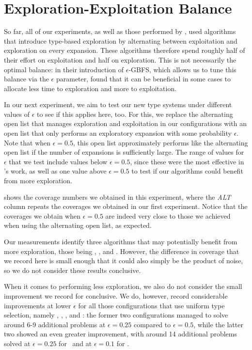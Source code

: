 \section{Exploration-Exploitation Balance}

So far, all of our experiments, as well as those performed by , used algorithms that introduce type-based exploration by alternating between exploitation and exploration on every expansion. These algorithms therefore spend roughly half of their effort on exploitation and half on exploration. This is not necessarily the optimal balance: in their introduction of $\epsilon$-GBFS, which allows us to tune this balance via the $\epsilon$ parameter,  found that it can be beneficial in some cases to allocate less time to exploration and more to exploitation.

In our next experiment, we aim to test our new type systems under different values of $\epsilon$ to see if this applies here, too. For this, we replace the alternating open list that manages exploration and exploitation in our configurations with an open list that only performs an exploratory expansion with some probability $\epsilon$. Note that when $\epsilon=0.5$, this open list approximately performs like the alternating open list if the number of expansions is sufficiently large. The range of values for $\epsilon$ that we test include values below $\epsilon=0.5$, since these were the most effective in 's work, as well as one value above $\epsilon=0.5$ to test if our algorithms could benefit from more exploration.

 shows the coverage numbers we obtained in this experiment, where the \textit{ALT} column repeats the coverages we obtained in our first experiment. Notice that the coverages we obtain when $\epsilon=0.5$ are indeed very close to those we achieved when using the alternating open list, as expected.

Our measurements identify three algorithms that may potentially benefit from more exploration, those being \hgHu, \lwHh, and \lwDh. However, the difference in coverage that we record here is small enough that it could also simply be the product of noise, so we do not consider these results conclusive.

When it comes to performing less exploration, we also do not consider the small improvement we record for \hgUu conclusive. We do, however, record considerable improvements at lower $\epsilon$ for all those configurations that use uniform type selection, namely \hiUh, \lwUu, \hiUu, and \lwUh: the former two configurations managed to solve around 6-9 additional problems at $\epsilon=0.25$ compared to $\epsilon=0.5$, while the latter two showed an even greater improvement, with around 14 additional problems solved at $\epsilon=0.25$ for \lwUh\ and at $\epsilon=0.1$ for \hiUu.

